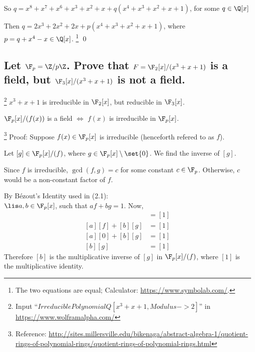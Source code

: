         So $q = x^8 + x^7 + x^6 + x^3 + x^2 + x + q(x^4 + x^3 + x^2 + x+1)$, for some $q\in \Q[x]$

        Then $q = 2x^3 + 2x^2 + 2x + p(x^4 + x^3 + x^2 + x+1)$, where $p = q+x^4 -x \in \Q[x]$.
        \footnote{The two equations are equal; Calculator: \url{https://www.symbolab.com/}.}
        \qed

    \newpage %
    \subsection[(ii)]{Let $\F_p = \Z/p\Z$. Prove that $F = \F_2[x]/(x^3+x+1)$ is a field,
        but $\F_3[x]/(x^3+x+1)$ is not a field.}
        
        \footnote{Input ``$IrreduciblePolynomialQ[x^3+x+1, Modulus -> 2]$'' in \url{https://www.wolframalpha.com/}}
        $x^3+x+1$ is irreducible in $\F_2[x]$,
        but reducible in $\F_3[x]$. 

        \begin{lemma}
            $\F_p[x] / (f(x))$ is a field $\iff$ $f(x)$ is irreducible in $\F_p[x]$.
        \end{lemma}
            \footnote{Reference: \url{http://sites.millersville.edu/bikenaga/abstract-algebra-1/quotient-rings-of-polynomial-rings/quotient-rings-of-polynomial-rings.html}}
            Proof:
            Suppose $f(x) \in \F_p[x]$ is irreducible (henceforth refered to as $f$).

            Let $[g] \in \F_p[x]/(f)$, where $g \in \F_p[x] \setminus \set{0}$.
            We find the inverse of $[g]$.

            Since $f$ is irreducible, $\gcd(f, g) = c$ for some constant $c \in \F_p$.
            Otherwise, $c$ would be a non-constant factor of $f$.

            By Bézout's Identity used in (2.1): \\
            $\lis a, b \in \F_p[x]$, such that 
            $af + bg = 1$.
            Now, 
            \begin{align*}
                [af + bg] &= [1] \\
                [a][f] + [b][g] &= [1] \\
                [a][0] + [b][g] &= [1] \\
                [b][g] &= [1]
            \end{align*}
            Therefore $[b]$ is the multiplicative inverse of $[g]$ in $\F_p[x] / (f)$,
            where $[1]$ is the multiplicative identity.

